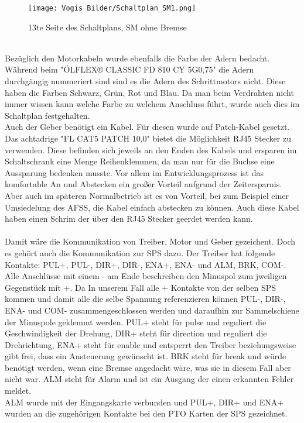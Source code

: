     \begin{figure}[h]
        \centering
        \texttt{[image: Vogis Bilder/Schaltplan\_SM1.png]}
        \caption{13te Seite des Schaltplans, SM ohne Bremse}
        \label{fig:SMohneBremse}
    \end{figure}
    \\Bezüglich den Motorkabeln wurde ebenfalls die Farbe der Adern bedacht. Während beim "ÖLFLEX® CLASSIC FD 810 CY 5G0,75" die Adern durchgängig nummeriert sind sind es die Adern des Schrittmotors nicht. Diese haben die Farben Schwarz, Grün, Rot und Blau. Da man beim Verdrahten nicht immer wissen kann welche Farbe zu welchem Anschluss führt, wurde auch dies im Schaltplan festgehalten.\cite{Nema_SM_Kontaktbezeichnung}\\
    Auch der Geber benötigt ein Kabel. Für diesen wurde auf Patch-Kabel gesetzt. Das achtadrige "FL CAT5 PATCH 10,0" bietet die Möglichkeit RJ45 Stecker zu verwenden. Diese befinden sich jeweils an den Enden des Kabels und ersparen im Schaltschrank eine Menge Reihenklemmen, da man nur für die Buchse eine Aussparung bedenken musste. Vor allem im Entwicklungsprozess ist das komfortable An und Abstecken ein großer Vorteil aufgrund der Zeitersparnis. Aber auch im späteren Normalbetrieb ist es von Vorteil, bei zum Beispiel einer Umsiedelung des AFSS, die Kabel einfach abstecken zu können. Auch diese Kabel haben einen Schrim der über den RJ45 Stecker geerdet werden kann.\\\\
    Damit wäre die Kommunikation von Treiber, Motor und Geber gezeichent. Doch es gehört auch die Kommunikation zur SPS dazu. Der Treiber hat folgende Kontakte: PUL+, PUL-, DIR+, DIR-, ENA+, ENA- und ALM, BRK, COM-. Alle Anschlüsse mit einem - am Ende beschreiben den Minuspol zum jweiligen Gegenstück mit +. Da In unserem Fall alle + Kontakte von der selben SPS kommen und damit alle die selbe Spannung referenzieren können PUL-, DIR-, ENA- und COM- zusammengeschlossen werden und daraufhin zur Sammelschiene der Minuspole geklemmt werden. PUL+ steht für pulse und reguliert die Geschwindigkeit der Drehung,  DIR+ steht für direction und reguliert die Drehrichtung, ENA+ steht für enable und entsperrt den Treiber beziehungsweise gibt frei, dass ein Ansteuerung gewünscht ist. BRK steht für break und würde benötigt werden, wenn eine Bremse angedacht wäre, was sie in diesem Fall aber nicht war. ALM steht für Alarm und ist ein Ausgang der einen erkannten Fehler meldet.\\
    ALM wurde mit der Eingangskarte verbunden und PUL+, DIR+ und ENA+ wurden an die zugehörigen Kontakte bei den PTO Karten der SPS gezeichnet.\\     
